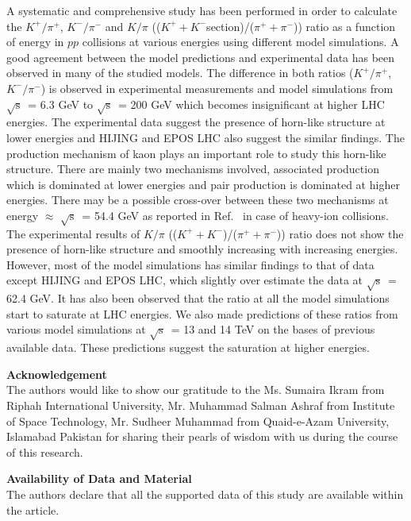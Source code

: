 \documentclass{article}
\newcommand{\sqrts}{\mbox{$\sqrt{\mathrm{s}}$}}
\begin{document}
A systematic and comprehensive study has been performed in order to calculate the $K^+/\pi^+$, $K^-/\pi^-$ and $K/\pi$ (($K^+ + K^-$section)/($\pi^+ + \pi^-$)) ratio as a function of energy in $pp$ collisions at various energies using different model simulations. A good agreement between the model predictions and experimental data has been observed in many of the studied models. The difference in both ratios ($K^+/\pi^+$, $K^-/\pi^-$) is observed in experimental measurements and model simulations from \sqrts~= 6.3 GeV to \sqrts~= 200 GeV which becomes insignificant at higher LHC energies. The experimental data suggest the presence of horn-like structure at lower energies and HIJING and EPOS LHC also suggest the similar findings. The production mechanism of kaon plays an important role to study this horn-like structure. There are mainly two mechanisms involved, associated production which is dominated at lower energies and pair production is dominated at higher energies. There may be a possible cross-over between these two mechanisms at energy $\approx$ \sqrts~= 54.4 GeV as reported in Ref.~\cite{Ashraf:2021nkb} in case of heavy-ion collisions. The experimental results of $K/\pi$ (($K^+ + K^-$)/($\pi^+ + \pi^-$)) ratio does not show the presence of horn-like structure and smoothly increasing with increasing energies. However, most of the model simulations has similar findings to that of data except HIJING and EPOS LHC, which slightly over estimate the data at \sqrts~= 62.4 GeV. It has also been observed that the ratio at all the model simulations start to saturate at LHC energies. We also made predictions of these ratios from various model simulations at \sqrts~= 13 and 14 TeV on the bases of previous available data. These predictions suggest the saturation at higher energies.  

\vskip0.5cm
\textbf{Acknowledgement}\\
The authors would like to show our gratitude to the Ms. Sumaira Ikram from Riphah International University, Mr. Muhammad Salman Ashraf from Institute of Space Technology, Mr. Sudheer Muhammad from Quaid-e-Azam University, Islamabad Pakistan for sharing their pearls of wisdom with us during the course of this research. 

\vskip0.5cm
\textbf{Availability of Data and Material}\\
The authors declare that all the supported data of this study are available within the article.








\end{document}
